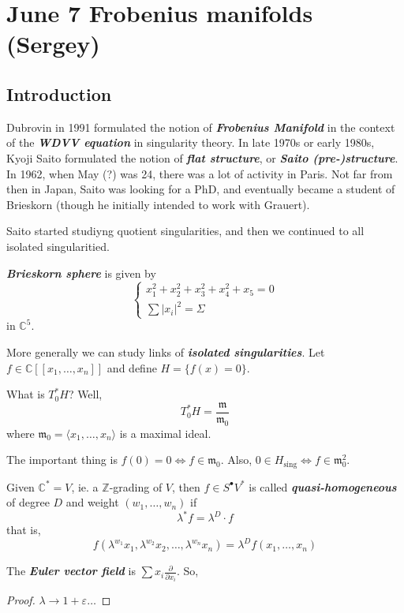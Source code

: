 \section{June 7 Frobenius manifolds (Sergey)}%
\label{sec:June 7}


\subsection{Introduction}
Dubrovin in 1991 formulated the notion of \textit{\textbf{Frobenius Manifold}} in the context of the \textit{\textbf{WDVV equation}} in singularity theory. In late 1970s or early 1980s, Kyoji Saito formulated the notion of \textit{\textbf{flat structure}}, or \textit{\textbf{Saito (pre-)structure}}. In 1962, when May (?) was 24, there was a lot of activity in Paris. Not far from then in Japan, Saito was looking for a PhD, and eventually became a student of Brieskorn (though he initially intended to work with Grauert).

Saito started studiyng quotient singularities, and then we continued to all isolated singularitied.

\textit{\textbf{Brieskorn sphere}} is given by
\[\begin{cases}
x_1^2+x_2^2+x_3^2+x_4^2+x_5=0\\
\sum|x_i|^2=\Sigma
\end{cases}\]
in $\mathbb{C}^5$.

More generally we can study links of \textit{\textbf{isolated singularities}}. Let $f\in\mathbb{C}[[x_1,\ldots,x_n]]$ and define $H=\{f(x)=0\}$.

What is $T_0^*H$? Well,
\[T_0^*H=\frac{\mathfrak{m}}{\mathfrak{m}_0}\] where $\mathfrak{m_0}=\langle x_1,\ldots,x_n\rangle$ is a maximal ideal.

The important thing is $f(0)=0\iff f\in\mathfrak{m}_0$. Also, $0\in H_{\operatorname{ s i n g}}\iff f\in \mathfrak{m}_0^2$.

\begin{defn}
	Given $\mathbb{C}^*=V$, ie. a $\mathbb{Z}$-grading of $V$, then $f\in S^\bullet V^*$ is called \textit{\textbf{quasi-homogeneous}} of degree $D$ and weight $(w_1,\ldots,w_n)$ if
	\[\lambda^*f=\lambda^D\cdot f\]
that is,
\[f(\lambda^{w_1}x_1,\lambda^{w_2}x_2,\ldots,\lambda^{w_n}x_n) =\lambda^Df(x_1,\ldots,x_n)\]
\end{defn}
\begin{prop}[Euler]
	The \textit{\textbf{Euler vector field}} is $\sum x_i \frac{\partial }{\partial x_i}$. So,
\end{prop}
\begin{proof}
	$\lambda\to 1+\varepsilon \ldots$
\end{proof}

